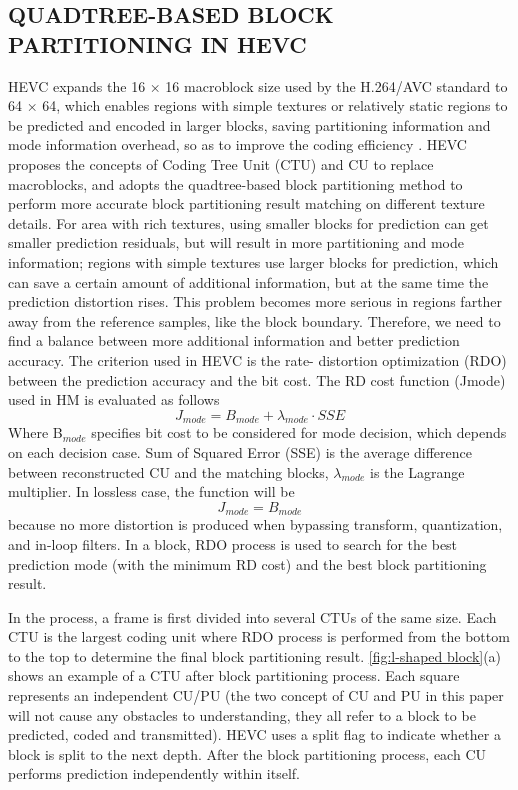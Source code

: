 \documentclass[journal]{IEEEtran}
\begin{document}
\subsection{QUADTREE-BASED BLOCK PARTITIONING IN HEVC}
HEVC expands the 16 × 16 macroblock size used by the H.264/AVC standard to 64 × 64, which enables regions with simple textures or relatively static regions to be predicted and encoded in larger blocks, saving partitioning information and mode information overhead, so as to improve the coding efficiency . HEVC proposes the concepts of Coding Tree Unit (CTU) and CU to replace macroblocks, and adopts the quadtree-based block partitioning method to perform more accurate block partitioning result matching on different texture details. For area with rich textures, using smaller blocks for prediction can get smaller prediction residuals, but will result in more partitioning and mode information; regions with simple textures use larger blocks for prediction, which can save a certain amount of additional information, but at the same time the prediction distortion rises. This problem becomes more serious in regions farther away from the reference samples, like the block boundary. Therefore, we need to find a balance between more additional information and better prediction accuracy. The criterion used in HEVC is the rate- distortion optimization (RDO) between the prediction accuracy and the bit cost. The RD cost function (Jmode) used in HM is evaluated as follows \cite{17}
\begin{equation}
    J_{mode}=B_{mode}+\lambda_{mode}\cdot SSE
\end{equation}
Where B$_{mode}$ specifies bit cost to be considered for mode decision, which depends on each decision case. Sum of Squared Error (SSE) is the average difference between reconstructed CU and the matching blocks, $\lambda_{mode}$ is the Lagrange multiplier. In lossless case, the function will be
\begin{equation}
    J_{mode}=B_{mode}
    \label{RDo}
\end{equation}
because no more distortion is produced when bypassing transform, quantization, and in-loop filters. In a block, RDO process is used to search for the best prediction mode (with the minimum RD cost) and the best block partitioning result.

In the process, a frame is first divided into several CTUs of the same size. Each CTU is the largest coding unit where RDO process is performed from the bottom to the top to determine the final block partitioning result. \autoref{fig:l-shaped block}(a) shows an example of a CTU after block partitioning process. Each square represents an independent CU/PU (the two concept of CU and PU in this paper will not cause any obstacles to understanding, they all refer to a block to be predicted, coded and transmitted). HEVC uses a split flag to indicate whether a block is split to the next depth. After the block partitioning process, each CU performs prediction independently within itself.
\end{document}

